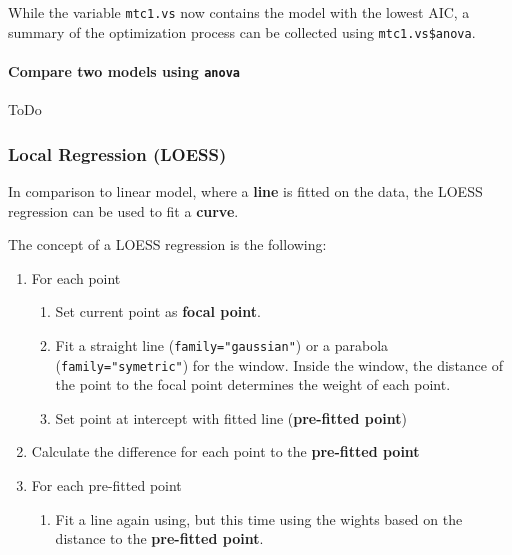 While the variable \lstinline{mtc1.vs} now contains the model with the lowest AIC, a summary of the optimization process can be collected using \lstinline{mtc1.vs$anova}.

\paragraph{Compare two models using \lstinline{anova}}
ToDo %

\subsubsection{Local Regression (LOESS)}
In comparison to linear model, where a \textbf{line} is fitted on the data, the LOESS regression can be used to fit a \textbf{curve}.

The concept of a LOESS regression is the following:

\begin{enumerate}
	\tightlist
	\item For each point
	\begin{enumerate}
		\tightlist
		\item Set current point as \textbf{focal point}.
		\item Fit a straight line (\lstinline{family="gaussian"}) or a parabola (\lstinline{family="symetric"}) for the window. Inside the window, the distance of the point to the focal point determines the weight of each point.
		\item Set point at intercept with fitted line (\textbf{pre-fitted point})
	\end{enumerate}
	\item Calculate the difference for each point to the \textbf{pre-fitted point}
	\item For each pre-fitted point
	\begin{enumerate}
		\item Fit a line again using, but this time using the wights based on the distance to the \textbf{pre-fitted point}.
	\end{enumerate}
\end{enumerate}

